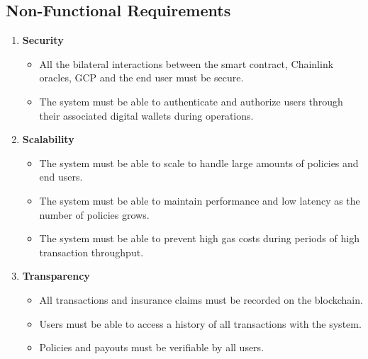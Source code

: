 \subsection{Non-Functional Requirements}
\begin{enumerate}
    \item \textbf{Security}
    \begin{itemize}
        \item All the bilateral interactions between the smart contract, Chainlink oracles, GCP and the end user must be secure.
        \item The system must be able to authenticate and authorize users through their associated digital wallets during operations.
    \end{itemize}
    
    \item \textbf{Scalability}
    \begin{itemize}
        \item The system must be able to scale to handle large amounts of policies and end users.
        \item The system must be able to maintain performance and low latency as the number of policies grows.
        \item The system must be able to prevent high gas costs during periods of high transaction throughput.
    \end{itemize}
    
    \item \textbf{Transparency}
    \begin{itemize}
        \item All transactions and insurance claims must be recorded on the blockchain.
        \item Users must be able to access a history of all transactions with the system.
        \item Policies and payouts must be verifiable by all users.
    \end{itemize}
\end{enumerate}


